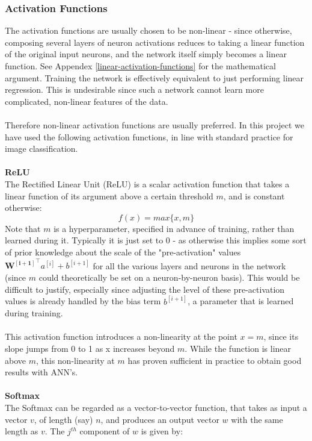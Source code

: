 \documentclass[11pt]{article} %
\theoremstyle{plain}
\theoremstyle{definition}
\begin{document}
\subsubsection{Activation Functions}
The activation functions are usually chosen to be non-linear - since otherwise, composing several layers of neuron activations reduces to taking a linear function of the original input neurons, and the network itself simply becomes a linear function. See Appendex \ref{linear-activation-functions} for the mathematical argument.  Training the network is effectively equivalent to just performing linear regression. This is undesirable since such a network cannot learn more complicated, non-linear features of the data.
\\
\\
\noindent
Therefore non-linear activation functions are usually preferred. In this project we have used the following activation functions, in line with standard practice for image classification.
\\
\\
\noindent
\textbf{ReLU}
\\
\noindent
The Rectified Linear Unit (ReLU) is a scalar activation function that takes a linear function of its argument above a certain threshold \(m\), and is constant otherwise:
\[f(x) = max\{x,m\} \] 
Note that \(m\) is a hyperparameter, specified in advance of training, rather than learned during it. Typically it is just set to 0 - as otherwise this implies some sort of prior knowledge about the scale of the "pre-activation" values \(\mathbf{{W^{[i+1]}}^{\top}}a^{[i]} + b^{[i+1]} \) for all the various layers and neurons in the network (since \(m\) could theoretically be set on a neuron-by-neuron basis). This would be difficult to justify, especially since adjusting the level of these pre-activation values is already handled by the bias term \(b^{[i+1]}\), a parameter that is learned during training.  
\\
\\
\noindent
This activation function introduces a non-linearity at the point \(x=m\), since its slope jumps from 0 to 1 as x increases beyond \(m\). While the function is linear above \(m\), this non-linearity at \(m\) has proven sufficient in practice to obtain good results with ANN's.
\\
\\
\noindent
\textbf{Softmax}
\\
\noindent
The Softmax can be regarded as a vector-to-vector function, that takes as input a vector \(v\), of length (say) \(n\), and produces an output vector \(w\) with the same length as \(v\). The \(j^{th}\) component of \(w\) is given by:
\end{document}
